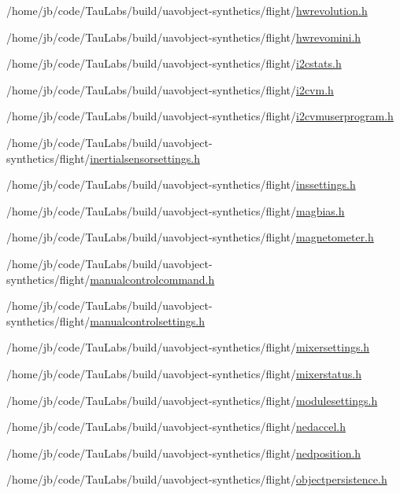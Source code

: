 \begin{DoxyCompactItemize}
/home/jb/code/\-Tau\-Labs/build/uavobject-\/synthetics/flight/\hyperlink{hwrevolution_8h}{hwrevolution.\-h}\item 
/home/jb/code/\-Tau\-Labs/build/uavobject-\/synthetics/flight/\hyperlink{hwrevomini_8h}{hwrevomini.\-h}\item 
/home/jb/code/\-Tau\-Labs/build/uavobject-\/synthetics/flight/\hyperlink{i2cstats_8h}{i2cstats.\-h}\item 
/home/jb/code/\-Tau\-Labs/build/uavobject-\/synthetics/flight/\hyperlink{build_2uavobject-synthetics_2flight_2i2cvm_8h}{i2cvm.\-h}\item 
/home/jb/code/\-Tau\-Labs/build/uavobject-\/synthetics/flight/\hyperlink{i2cvmuserprogram_8h}{i2cvmuserprogram.\-h}\item 
/home/jb/code/\-Tau\-Labs/build/uavobject-\/synthetics/flight/\hyperlink{inertialsensorsettings_8h}{inertialsensorsettings.\-h}\item 
/home/jb/code/\-Tau\-Labs/build/uavobject-\/synthetics/flight/\hyperlink{inssettings_8h}{inssettings.\-h}\item 
/home/jb/code/\-Tau\-Labs/build/uavobject-\/synthetics/flight/\hyperlink{magbias_8h}{magbias.\-h}\item 
/home/jb/code/\-Tau\-Labs/build/uavobject-\/synthetics/flight/\hyperlink{magnetometer_8h}{magnetometer.\-h}\item 
/home/jb/code/\-Tau\-Labs/build/uavobject-\/synthetics/flight/\hyperlink{manualcontrolcommand_8h}{manualcontrolcommand.\-h}\item 
/home/jb/code/\-Tau\-Labs/build/uavobject-\/synthetics/flight/\hyperlink{manualcontrolsettings_8h}{manualcontrolsettings.\-h}\item 
/home/jb/code/\-Tau\-Labs/build/uavobject-\/synthetics/flight/\hyperlink{mixersettings_8h}{mixersettings.\-h}\item 
/home/jb/code/\-Tau\-Labs/build/uavobject-\/synthetics/flight/\hyperlink{mixerstatus_8h}{mixerstatus.\-h}\item 
/home/jb/code/\-Tau\-Labs/build/uavobject-\/synthetics/flight/\hyperlink{modulesettings_8h}{modulesettings.\-h}\item 
/home/jb/code/\-Tau\-Labs/build/uavobject-\/synthetics/flight/\hyperlink{nedaccel_8h}{nedaccel.\-h}\item 
/home/jb/code/\-Tau\-Labs/build/uavobject-\/synthetics/flight/\hyperlink{nedposition_8h}{nedposition.\-h}\item 
/home/jb/code/\-Tau\-Labs/build/uavobject-\/synthetics/flight/\hyperlink{objectpersistence_8h}{objectpersistence.\-h}\item 

\end{DoxyCompactItemize}
